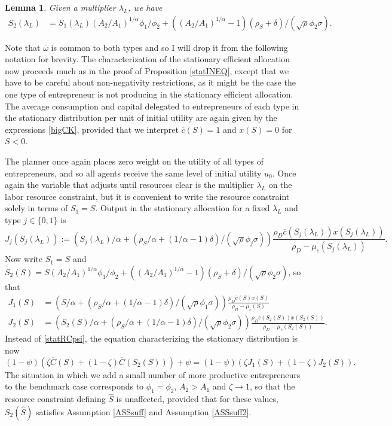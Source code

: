 \documentclass[11pt]{article}
\theoremstyle{plain}
\newtheorem{lemma}[thm]{Lemma}
\theoremstyle{definition} %
\begin{document}
\begin{lemma}
Given a multiplier $\lambda_L$, we have 
\begin{equation}
\begin{aligned}
S_2(\lambda_L) & = S_1(\lambda_L) (A_2/A_1)^{1/\alpha}\phi_1/\phi_2 + ((A_2/A_1)^{1/\alpha}-1)(\rho_S + \delta)/(\sqrt{\rho} \phi_2 \sigma).
\label{S1S2}
\end{aligned}
\end{equation} 
\end{lemma}

Note that $\overline{\omega}$ is common to both types and so I will drop it from the following notation for brevity. The characterization of the stationary efficient allocation now proceeds much as in the proof of Proposition \ref{statINEQ}, except that we have to be careful about non-negativity restrictions, as it might be the case the one type of entrepreneur is not producing in the stationary efficient allocation. The average consumption and capital delegated to entrepreneurs of each type in the stationary distribution per unit of initial utility are again given by the expressions \eqref{bigCK}, provided that we interpret $\overline{c}(S) = 1$ and $x(S) = 0$ for $S < 0$.

The planner once again places zero weight on the utility of all types of entrepreneurs, and so all agents receive the same level of initial utility $u_0$. Once again the variable that adjusts until resources clear is the multiplier $\lambda_L$ on the labor resource constraint, but it is convenient to write the resource constraint solely in terms of $S_1 = S$. Output in the stationary allocation for a fixed $\lambda_L$ and type $j \in \{0,1\}$ is
$$
J_j(S_j(\lambda_L)) := {\left(S_j(\lambda_L)/\alpha + (\rho_S/\alpha + (1/\alpha-1)\delta)/(\sqrt{\rho} \phi_j \sigma) \right)}\frac{\rho_D\overline{c}(S_j(\lambda_L))x(S_j(\lambda_L))}{\rho_D - \mu_c(S_j(\lambda_L))}.
$$ 
Now write $S_1 = S$ and $S_2(S) = S(A_2/A_1)^{1/\alpha}\phi_1/\phi_2 + ((A_2/A_1)^{1/\alpha}-1)(\rho_S + \delta)/(\sqrt{\rho}\phi_2\sigma)$, so that
\begin{align*}
J_1(S) & = {\left(S/\alpha + (\rho_S/\alpha + (1/\alpha - 1)\delta)/(\sqrt{\rho}\phi_1\sigma) \right)}\frac{\rho_D\overline{c}(S)x(S)}{\rho_D - \mu_c(S)} 
\\ J_2(S) & = {\left(S_2(S)/\alpha + (\rho_S/\alpha + (1/\alpha - 1)\delta)/(\sqrt{\rho} \phi_2 \sigma) \right)}
 \frac{\rho_D\overline{c}(S_2(S))x(S_2(S))}{\rho_D - \mu_c(S_2(S))}.
\end{align*}
Instead of \eqref{statRCpsi}, the equation characterizing the stationary distribution is now
\begin{equation}
(1-\psi)(\zeta \overline{C}(S) + (1-\zeta)\overline{C}(S_2(S))) + \psi = (1-\psi)(\zeta J_1(S) + (1 - \zeta) J_2(S)).
\label{statRCpsi3}
\end{equation}
The situation in which we add a small number of more productive entrepreneurs to the benchmark case corresponds to $\phi_1 = \phi_2$, $A_2 > A_1$ and $\zeta \rightarrow 1$, so that the resource constraint defining $\hat{S}$ is unaffected, provided that for these values, $S_2(\hat{S})$ satisfies Assumption \ref{ASSsuff} and Assumption \ref{ASSsuff2}.
\end{document}
